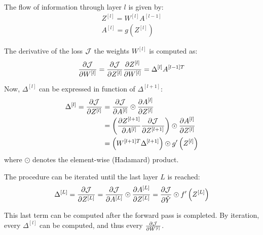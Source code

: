 The flow of information through layer $l$ is given by:
\begin{gather*}
    Z^{[l]} = W^{[l]} A^{[l-1]}\\
    A^{[l]} = g\left(Z^{[l]}\right)
\end{gather*}

The derivative of the loss $\mathcal{J}$ \wrt the weights $W^{[l]}$ is computed as:
\begin{equation*}
    \pdv{\mathcal{J}}{W^{[l]}} = \pdv{\mathcal{J}}{Z^{[l]}} \pdv{Z^{[l]}}{W^{[l]}} = \Delta^{[l]} A^{[l-1]T}
\end{equation*}

Now, $\Delta^{[l]}$ can be expressed in function of $\Delta^{[l + 1]}$:
\begin{align*}
    \Delta^{[l]} = \pdv{\mathcal{J}}{Z^{[l]}} &= \pdv{\mathcal{J}}{A^{[l]}} \odot \pdv{A^{[l]}}{Z^{[l]}}\\
    &= \left(\pdv{Z^{[l+1]}}{A^{[l]}} \pdv{\mathcal{J}}{Z^{[l+1]}} \right) \odot \pdv{A^{[l]}}{Z^{[l]}}\\
    &= \left(W^{[l+1]T} \Delta^{[l+1]} \right) \odot g'\left(Z^{[l]}\right)
\end{align*}
where $\odot$ denotes the element-wise (Hadamard) product.

The procedure can be iterated until the last layer $L$ is reached:
\begin{align*}
    \Delta^{[L]} = \pdv{\mathcal{J}}{Z^{[L]}} = \pdv{\mathcal{J}}{A^{[L]}} \odot \pdv{A^{[L]}}{Z^{[L]}} = \pdv{\mathcal{J}}{\hat{Y}} \odot f'\left(Z^{[L]}\right)
\end{align*}

This last term can be computed after the forward pass is completed. By iteration, every $\Delta^{[l]}$ can be computed, and thus every $\pdv{\mathcal{J}}{W^{[l]}}$.
